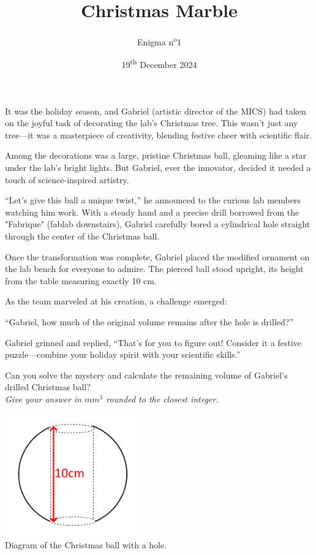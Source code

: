 \documentclass[a4paper, top=10mm]{article}
\title{\textbf{\huge{Christmas Marble}}}
\author{Enigma n\textsuperscript{o}1}
\date{19\textsuperscript{th} December 2024}
\begin{document}
	\maketitle
	
	It was the holiday season, and Gabriel (artistic director of the MICS) had taken on the joyful task of decorating the lab’s Christmas tree.
	This wasn’t just any tree—it was a masterpiece of creativity, blending festive cheer with scientific flair.
	
	Among the decorations was a large, pristine Christmas ball, gleaming like a star under the lab’s bright lights.
	But Gabriel, ever the innovator, decided it needed a touch of science-inspired artistry.
	
	“Let’s give this ball a unique twist,” he announced to the curious lab members watching him work. With a steady hand and a precise drill borrowed from the "Fabrique" (fablab downstairs), Gabriel carefully bored a cylindrical hole straight through the center of the Christmas ball.
	
	Once the transformation was complete, Gabriel placed the modified ornament on the lab bench for everyone to admire. The pierced ball stood upright, its height from the table measuring exactly 10 cm.
	
	As the team marveled at his creation, a challenge emerged:
	
	“Gabriel, how much of the original volume remains after the hole is drilled?”
	
	Gabriel grinned and replied, “That’s for you to figure out! Consider it a festive puzzle—combine your holiday spirit with your scientific skills.”
	
	Can you solve the mystery and calculate the remaining volume of Gabriel’s drilled Christmas ball?\\
	\textit{Give your answer in $mm^3$ rounded to the closest integer.}
	
	\begin{center}
		\includegraphics[height=150pt]{01xmas_pearl.png}\\
		Diagram of the Christmas ball with a hole.
	\end{center}
	
\end{document}
